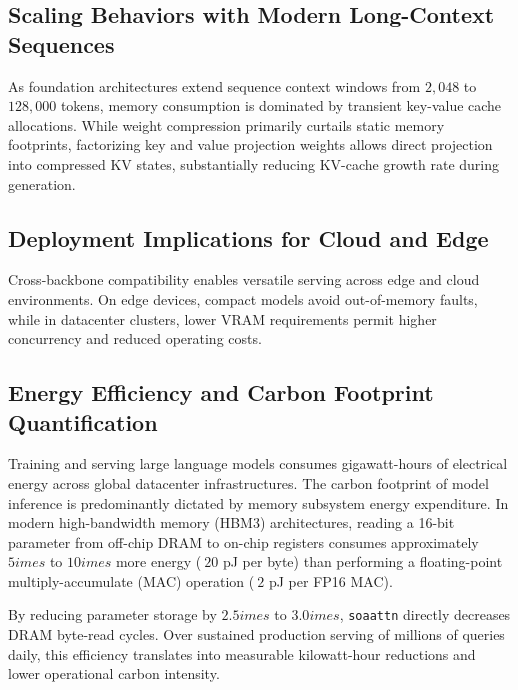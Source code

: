 \subsection{Scaling Behaviors with Modern Long-Context Sequences}
As foundation architectures extend sequence context windows from $2{,}048$ to $128{,}000$ tokens, memory consumption is dominated by transient key-value cache allocations. While weight compression primarily curtails static memory footprints, factorizing key and value projection weights allows direct projection into compressed KV states, substantially reducing KV-cache growth rate during generation.

\subsection{Deployment Implications for Cloud and Edge}
Cross-backbone compatibility enables versatile serving across edge and cloud environments. On edge devices, compact models avoid out-of-memory faults, while in datacenter clusters, lower VRAM requirements permit higher concurrency and reduced operating costs.

\subsection{Energy Efficiency and Carbon Footprint Quantification}
Training and serving large language models consumes gigawatt-hours of electrical energy across global datacenter infrastructures. The carbon footprint of model inference is predominantly dictated by memory subsystem energy expenditure. In modern high-bandwidth memory (HBM3) architectures, reading a 16-bit parameter from off-chip DRAM to on-chip registers consumes approximately $5	imes$ to $10	imes$ more energy ($~20$ pJ per byte) than performing a floating-point multiply-accumulate (MAC) operation ($~2$ pJ per FP16 MAC).

By reducing parameter storage by $2.5	imes$ to $3.0	imes$, \texttt{soaattn} directly decreases DRAM byte-read cycles. Over sustained production serving of millions of queries daily, this efficiency translates into measurable kilowatt-hour reductions and lower operational carbon intensity.
